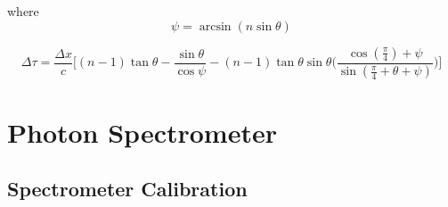 where
\begin{equation}
	\psi = \arcsin(n\sin\theta)
\end{equation}

\begin{equation}
\label{eqn:time_delay}
	\Delta\tau = \frac{\Delta x}{c}\Bigg[(n-1)\tan\theta - \frac{\sin\theta}{\cos\psi}-(n-1)\tan\theta\sin\theta\bigg(\frac{\cos(\frac{\pi}{4})+\psi}{\sin(\frac{\pi}{4}+\theta+\psi)}\bigg)\Bigg]
\end{equation}

\section{Photon Spectrometer}
\label{sec:photon_spec}
\subsection{Spectrometer Calibration}
\label{subsec:spec_calibration}